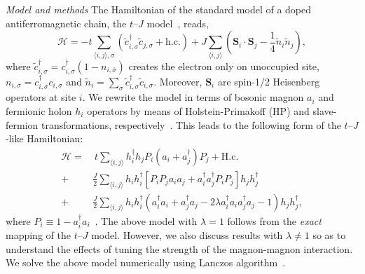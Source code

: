 \documentclass[%
 reprint,
 amsmath,amssymb,
 aps,
prl,
]{revtex4-1}
\newcommand{\mean}[1]{\langle#1\rangle}
\begin{document}
{\it Model and methods}
The Hamiltonian of the standard model of a doped antiferromagnetic chain, the $t$--$J$ model~\cite{Chao1978}, reads,
\begin{equation} \label{eq:H}
    \mathcal{H} = -t\!\!\sum_{\mean{i,j},\sigma}\!\! \left( \tilde{c}_{i,\sigma}^\dag \tilde{c}_{j,\sigma}\! +\! \text{h.c.}\right) + J\!\sum_{\mean{i,j}}\!\!\left(\mathbf S_i \! \cdot\! \mathbf S_j\! -\! \frac{1}{4}\tilde{n}_i\tilde{n}_j \!\right)\!,
\end{equation}
where $\tilde{c}_{i,\sigma}^\dag = c_{i,\sigma}^\dag (1 - n_{i,\bar{\sigma}})$ creates the electron only on unoccupied site, $n_{i,\sigma} = c_{i,\sigma}^\dag c_{i,\sigma}$ and $\tilde{n}_i = \sum_{\sigma}\tilde{c}_{i,\sigma}^\dag\tilde{c}_{i,\sigma}$. Moreover, $\mathbf S_i$ are spin-1/2 Heisenberg operators at site $i$. We rewrite the model in terms of bosonic magnon $a_i$ and fermionic holon $h_i$ operators by means of Holstein-Primakoff (HP) and slave-fermion transformations, respectively~\cite{Mar91}. 
This leads to the following form of the $t$--$J$-like Hamiltonian:
{\color{red}
\begin{align}
\label{eq:model}
\mathcal{H} =&~t \sum_{\mean{i,j}} h_i^\dag h_j P_i \left( a_i + a_j^\dag \right) P_j + \mathrm{H.c.} \nonumber \\ 
+& \frac{J}{2}\sum_{\mean{i,j}} h_i h_i^\dag \left[P_i P_j a_i a_j + a_i^\dag a_j^\dag P_i P_j \right] h_j h_j^\dag \nonumber \\
+& \frac{J}{2} \sum_{\mean{i,j}} h_i h_i^\dag \left(a_i^\dag a_i + a_j^\dag a_j - 2 \lambda a_i^\dag a_i a_j^\dag a_j - 1\right) h_j h_j^\dag,
\end{align}
}
where $P_i \equiv 1-a_i^\dag a_i$~\cite{Kon21}.
The above model with $\lambda=1$ follows from the \textit{exact} mapping of the $t$--$J$ model. However, we also discuss results with $\lambda\ne 1$ so as to understand the effects of tuning the strength of the magnon-magnon interaction. We solve the above model numerically using Lanczos algorithm~\cite{KrylovKit}.
\end{document}
